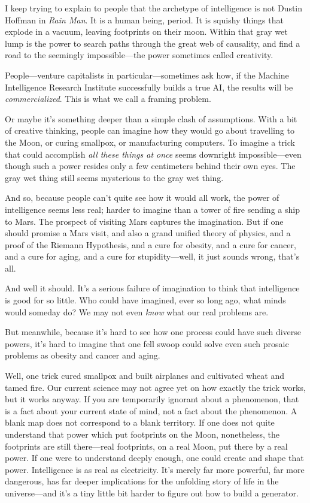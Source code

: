 {
 I keep trying to explain to people that the archetype of
intelligence is not Dustin Hoffman in \textit{Rain Man}. It is a human
being, period. It is squishy things that explode in a vacuum, leaving
footprints on their moon. Within that gray wet lump is the power to
search paths through the great web of causality, and find a road to the
seemingly impossible---the power sometimes called creativity.}

{
 People---venture capitalists in particular---sometimes ask how, if
the Machine Intelligence Research Institute successfully builds a true
AI, the results will be \textit{commercialized}. This is what we call a
framing problem.}

{
 Or maybe it's something deeper than a simple clash
of assumptions. With a bit of creative thinking, people can imagine how
they would go about travelling to the Moon, or curing smallpox, or
manufacturing computers. To imagine a trick that could accomplish
\textit{all these things at once} seems downright impossible---even
though such a power resides only a few centimeters behind their own
eyes. The gray wet thing still seems mysterious to the gray wet thing.}

{
 And so, because people can't quite see how it
would all work, the power of intelligence seems less real; harder to
imagine than a tower of fire sending a ship to Mars. The prospect of
visiting Mars captures the imagination. But if one should promise a
Mars visit, and also a grand unified theory of physics, and a proof of
the Riemann Hypothesis, and a cure for obesity, and a cure for cancer,
and a cure for aging, and a cure for stupidity---well, it just sounds
wrong, that's all.}

{
 And well it should. It's a serious failure of
imagination to think that intelligence is good for so little. Who could
have imagined, ever so long ago, what minds would someday do? We may
not even \textit{know} what our real problems are.}

{
 But meanwhile, because it's hard to see how one
process could have such diverse powers, it's hard to
imagine that one fell swoop could solve even such prosaic problems as
obesity and cancer and aging.}

{
 Well, one trick cured smallpox and built airplanes and cultivated
wheat and tamed fire. Our current science may not agree yet on how
exactly the trick works, but it works anyway. If you are temporarily
ignorant about a phenomenon, that is a fact about your current state of
mind, not a fact about the phenomenon. A blank map does not correspond
to a blank territory. If one does not quite understand that power which
put footprints on the Moon, nonetheless, the footprints are still
there---real footprints, on a real Moon, put there by a real power. If
one were to understand deeply enough, one could create and shape that
power. Intelligence is as real as electricity. It's
merely far more powerful, far more dangerous, has far deeper
implications for the unfolding story of life in the universe---and
it's a tiny little bit harder to figure out how to
build a generator.}

